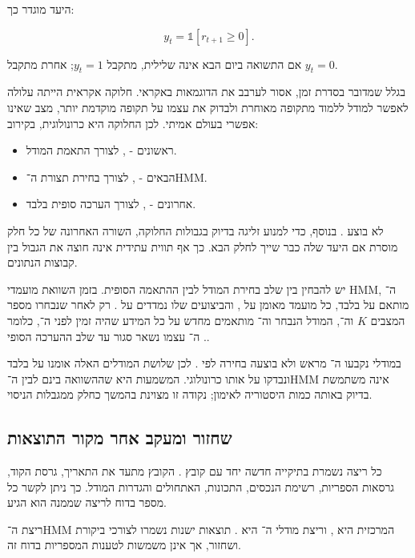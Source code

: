 היעד מוגדר כך:

\begin{equation}
y_t = \mathbb{1}\left[r_{t+1}\ge 0\right].
\end{equation}

אם התשואה ביום הבא אינה שלילית, מתקבל \(y_t=1\); אחרת מתקבל \(y_t=0\).

בגלל שמדובר בסדרת זמן, אסור לערבב את הדוגמאות באקראי. חלוקה אקראית הייתה עלולה לאפשר למודל ללמוד מתקופה מאוחרת ולבדוק את עצמו על תקופה מוקדמת יותר, מצב שאינו אפשרי בעולם אמיתי. לכן החלוקה היא כרונולוגית, בקירוב:

\begin{itemize}
    \item {} ראשונים - , לצורך התאמת המודל.
    \item {} הבאים - , לצורך בחירת תצורת ה־HMM.
    \item {} אחרונים - , לצורך הערכה סופית בלבד.
\end{itemize}

לא בוצע . בנוסף, כדי למנוע זליגה בדיוק בגבולות החלוקה, השורה האחרונה של כל חלק מוסרת אם היעד שלה כבר שייך לחלק הבא. כך אף תווית עתידית אינה חוצה את הגבול בין קבוצות הנתונים.

יש להבחין בין שלב בחירת המודל לבין ההתאמה הסופית. בזמן השוואת מועמדי HMM, ה־ מותאם על  בלבד, כל מועמד מאומן על , והביצועים שלו נמדדים על . רק לאחר שנבחרו מספר המצבים \(K\) וה־, המודל הנבחר וה־ מותאמים מחדש על כל המידע שהיה זמין לפני ה־, כלומר . ה־ עצמו נשאר סגור עד שלב ההערכה הסופי.

במודלי  נקבעו ה־ מראש ולא בוצעה בחירה לפי . לכן שלושת המודלים האלה אומנו על  בלבד ונבדקו על אותו  כרונולוגי. המשמעות היא שההשוואה בינם לבין ה־HMM אינה משתמשת בדיוק באותה כמות היסטוריה לאימון; נקודה זו מצוינת בהמשך כחלק ממגבלות הניסוי.

\subsection{שחזור ומעקב אחר מקור התוצאות}

כל ריצה נשמרת בתיקייה חדשה יחד עם קובץ . הקובץ מתעד את התאריך, גרסת הקוד, גרסאות הספריות, רשימת הנכסים, התכונות, האתחולים והגדרות המודל. כך ניתן לקשר כל מספר בדוח לריצה שממנה הוא הגיע.

ריצת ה־HMM המרכזית היא , וריצת מודלי ה־ היא . תוצאות ישנות נשמרו לצורכי ביקורת ושחזור, אך אינן משמשות לטענות המספריות בדוח זה.
